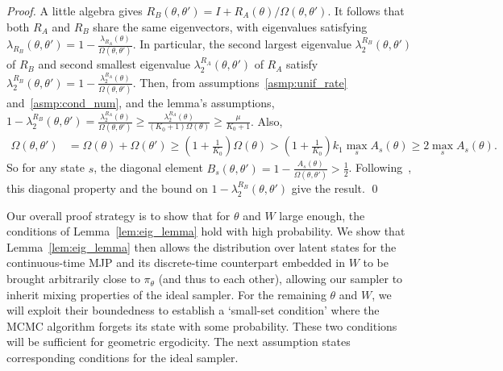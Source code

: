 \begin{proof}
A little algebra gives $R_B(\theta,\theta') = I + R_A(\theta)/\Omega(\theta,\theta')$. It 
follows that both $R_A$ and $R_B$ share the same eigenvectors, with 
eigenvalues satisfying 
$\lambda_{R_B}(\theta, \theta') = 1 - \frac{\lambda_{R_A}(\theta)}{\Omega(\theta,
\theta')}$. In particular, the second largest eigenvalue 
$\lambda_2^{R_B}(\theta,\theta')$ of $R_B$ and  
second smallest eigenvalue $\lambda^{R_A}_2(\theta,\theta')$ of $R_A$ satisfy  
$\lambda^{R_B}_2(\theta,\theta') = 1 - \frac{\lambda^{R_A}_2(\theta)}{\Omega(\theta, \theta')}$.
Then, from assumptions~\ref{asmp:unif_rate} and~\ref{asmp:cond_num}, and 
the lemma's assumptions, 
$1 - \lambda^{R_B}_2(\theta,\theta') = \frac{\lambda^{R_A}_2(\theta)}{\Omega(\theta, \theta')} 
\ge \frac{\lambda^{R_A}_2(\theta)}{(K_0+1)\Omega(\theta)} 
\ge \frac{\mu}{K_0+1} $. 
Also, 
\begin{align*}
\Omega(\theta, \theta') &= \Omega(\theta) + \Omega(\theta') \ge (1 + \frac{1}{K_0})\Omega(\theta)
 > (1 + \frac{1}{K_0})k_1\max_s A_{s}(\theta) \ge 2\max_s A_{s}(\theta). %
\end{align*}
So for any state $s$, the diagonal element $B_s(\theta, \theta') = 1 - 
\frac{A_s(\theta)}{\Omega(\theta, \theta')}> \frac{1}{2}$.
Following~\cite{fill1991}, this diagonal property and the bound 
on $1-\lambda_2^{R_B}(\theta,\theta')$ give the result.
\qed
\end{proof}

Our overall proof strategy is to show that for $\theta$ \boqian{$\| \theta \|$} and $W$ large 
enough, the conditions of Lemma~\ref{lem:eig_lemma} hold with 
high probability. We show that Lemma~\ref{lem:eig_lemma} then allows the 
distribution over latent states for the continuous-time MJP and its 
discrete-time counterpart embedded in $W$ to be brought arbitrarily 
close to $\pi_\theta$ (and thus to each other), allowing our sampler 
to inherit mixing properties of the ideal sampler. For the remaining 
$\theta$ and $W$, we will exploit their boundedness to establish a 
`small-set condition' where the MCMC algorithm forgets its state with 
some probability. These two conditions will be sufficient for 
geometric ergodicity. The next assumption states corresponding conditions 
for the ideal sampler.


